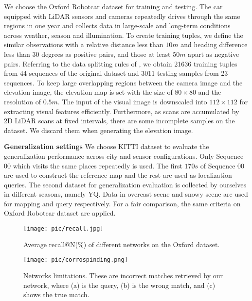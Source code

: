 \documentclass[letterpaper, 10 pt, conference]{ieeeconf}  \usepackage{tabularx}
\begin{document}
We choose the Oxford Robotcar dataset \cite{maddern20171} for training and testing. The car equipped with LiDAR sensors and cameras repeatedly drives through the same regions in one year and collects data in large-scale and long-term conditions across weather, season and illumination. To create training tuples, we define the similar observations with a relative distance less than $10m$ and heading difference less than 30 degrees as positive pairs, and those at least $50m$ apart as negative pairs. Referring to the data splitting rules of \cite{angelina2018pointnetvlad}, we obtain 21636 training tuples from 44 sequences of the original dataset and 3011 testing samples from 23 sequences. To keep large overlapping regions between the camera image and the elevation image, the elevation map is set with the size of $80\times80$ and the resolution of $0.5m$. The input of the visual image is downscaled into $112\times112$ for extracting visual features efficiently. Furthermore, as scans are accumulated by 2D LiDAR scans at fixed intervals, there are some incomplete samples on the dataset. We discard them when generating the elevation image.

\textbf{Generalization settings} We choose KITTI dataset \cite{geiger2012we} to evaluate the generalization performance across city and sensor configurations. Only Sequence 00 which visits the same places repeatedly is used. The first $170s$ of Sequence 00 are used to construct the reference map and the rest are used as localization queries. The second dataset for generalization evaluation is collected by ourselves in different seasons, namely YQ. Data in overcast scene and snowy scene are used for mapping and query respectively. For a fair comparison, the same criteria on Oxford Robotcar dataset are applied.



\begin{figure}[tp]
	\centering
	\texttt{[image: pic/recall.jpg]}
	
	\caption{Average recall@N(\%) of different networks on the Oxford dataset.}
	\label{recall1}
	\vspace{-10pt}
\end{figure}

\begin{figure}[tp]
	\centering
	\vspace{10pt}
	\texttt{[image: pic/corrospinding.png]}
	
	\caption{Networks limitations. These are incorrect matches retrieved by our network, where (a) is the query, (b) is the wrong match, and (c) shows the true match. }
	\label{limitation}
	\vspace{-6pt}
\end{figure}
\end{document}
